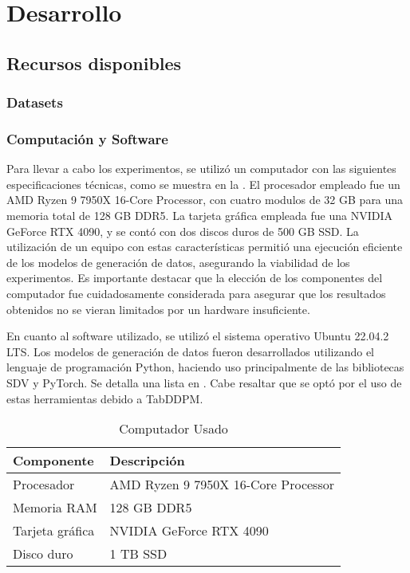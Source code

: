 \chapter{Desarrollo}
\section{Recursos disponibles}
\subsection{Datasets}
\subsection{Computación y Software}

Para llevar a cabo los experimentos, se utilizó un computador con las siguientes especificaciones técnicas, como se muestra en la . El procesador empleado fue un AMD Ryzen 9 7950X 16-Core Processor, con cuatro modulos de 32 GB para una memoria total de 128 GB DDR5. La tarjeta gráfica empleada fue una NVIDIA GeForce RTX 4090, y se contó con dos discos duros de 500 GB SSD. La utilización de un equipo con estas características permitió una ejecución eficiente de los modelos de generación de datos, asegurando la viabilidad de los experimentos. Es importante destacar que la elección de los componentes del computador fue cuidadosamente considerada para asegurar que los resultados obtenidos no se vieran limitados por un hardware insuficiente.

En cuanto al software utilizado, se utilizó el sistema operativo Ubuntu 22.04.2 LTS. Los modelos de generación de datos fueron desarrollados utilizando el lenguaje de programación Python, haciendo uso principalmente de las bibliotecas SDV y PyTorch. Se detalla una lista en . Cabe resaltar que se optó por el uso de estas herramientas debido a TabDDPM.

\begin{table}[H]
	\centering
	\caption{Computador Usado}
	\label{tabla-componentes-pc}
    \begin{tabular}{|l|l|}
        \hline
        \rowcolor[gray]{0.8}
        Componente & Descripción \\
        \hline
        Procesador & AMD Ryzen 9 7950X 16-Core Processor \\
        \hline
        Memoria RAM & 128 GB DDR5 \\
        \hline
        Tarjeta gráfica & NVIDIA GeForce RTX 4090 \\
        \hline
        Disco duro & 1 TB SSD \\
        \hline
      \end{tabular}        
\end{table}  

